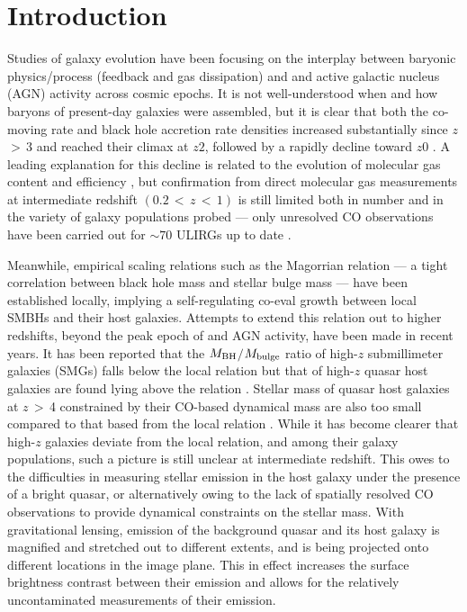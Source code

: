 \documentclass[]{emulateapj}
\begin{document}
\section{Introduction}
Studies of galaxy evolution have been focusing on the interplay between baryonic physics/process
(\eg feedback and gas dissipation) and \SF and active galactic nucleus (AGN) activity across cosmic epochs.
It is not well-understood when and how baryons of present-day galaxies were assembled, 
but it is clear that both the co-moving \SF rate and black hole accretion rate densities
increased substantially since $z$\,$>\,3$ and reached their climax at $z$\ssim$2$, followed by 
a rapidly decline toward $z$\ssim$0$ \citep[\eg][]{Hopkins06a, Madau14a}. 
A leading explanation for this decline is related to the evolution of molecular gas content and 
\SF efficiency \citep[]{Erb06a, CW13, Walter14a},
but confirmation from direct molecular gas measurements at intermediate redshift 
$(0.2\,<\,z\,<\,1)$ is still limited both in number and in the variety of galaxy populations probed --- 
only unresolved CO observations have been carried out for $\sim$$70$ ULIRGs up to date \citep{Combes11a, Combes13a}.

Meanwhile, empirical scaling relations such as the Magorrian relation \citep{Magorrian98a}
--- a tight correlation between black hole mass and stellar bulge mass ---
have been established locally, implying a self-regulating co-eval growth between local SMBHs and their host galaxies.
Attempts to extend this relation out to higher redshifts, beyond the peak epoch 
of \SF and AGN activity, have been made in recent years.
It has been reported that the $M_{\rm BH}$$/$$M_{\rm bulge}$ ratio of high-$z$ submillimeter galaxies (SMGs) falls below 
the local relation \citep[\eg][]{Borys05a,Alexander08a} but that of high-$z$ quasar host galaxies are found 
lying above 
the relation \citep[\eg][]{McLure06a,Peng06a}.
Stellar mass of quasar host galaxies at $z$\,$>$\,4 constrained by their CO-based dynamical mass 
are also too small compared to that based from the local relation \citep{Walter04a, Riechers08a,Coppin08a}. 
While it has become clearer that high-$z$ galaxies deviate from the local relation, and among their galaxy populations, 
such a picture is still unclear  at intermediate redshift.
This owes to the difficulties in measuring stellar emission in the host galaxy under the presence of a bright quasar, or alternatively
owing to the lack of spatially resolved CO observations to provide dynamical constraints on the stellar mass. 
With gravitational lensing, emission of the background quasar and its host galaxy 
is magnified and stretched out to different extents, and is being projected onto different locations in the image plane.
This in effect increases the surface brightness contrast between their emission and allows for the
relatively uncontaminated measurements of their emission. 
\end{document}
